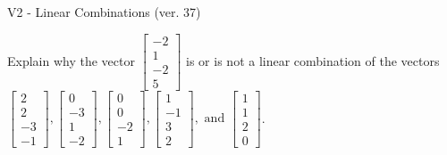 \begin{exercise}
  \begin{exerciseTitle}V2 - Linear Combinations (ver. 37)\end{exerciseTitle}
  \begin{exerciseStatement}
    Explain why the vector \(\left[\begin{array}{c}
-2 \\
1 \\
-2 \\
5
\end{array}\right]\)  is or is not a linear 
	combination of the vectors \(\left[\begin{array}{c}
2 \\
2 \\
-3 \\
-1
\end{array}\right] , \left[\begin{array}{c}
0 \\
-3 \\
1 \\
-2
\end{array}\right] , \left[\begin{array}{c}
0 \\
0 \\
-2 \\
1
\end{array}\right] , \left[\begin{array}{c}
1 \\
-1 \\
3 \\
2
\end{array}\right] , \text{ and } \left[\begin{array}{c}
1 \\
1 \\
2 \\
0
\end{array}\right]\).
	



\end{exerciseStatement}
\end{exercise}
